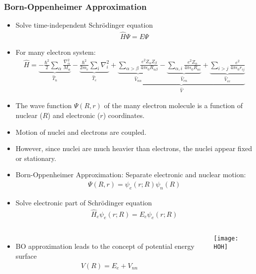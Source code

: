 \documentclass[slidestop,mathserif,compress,xcolor=svgnames]{beamer}
\begin{document}
\begin{frame}[allowframebreaks]
\frametitle{\small Born-Oppenheimer Approximation}
\footnotesize{
\begin{itemize}
\item Solve time-independent Schr\"{o}dinger equation
\begin{align*}
\hat{H}\Psi = E\Psi
\end{align*}
\item For many electron system:
\begin{align*}
\hat{H} = \underbrace{-\frac{\hbar^2}{2}\sum_\alpha\frac{\nabla^2_\alpha}{M_\alpha}}_{\hat{T}_n} - \underbrace{\frac{\hbar^2}{2m_e}\sum_i\nabla^2_i}_{\hat{T}_e} + \underbrace{\underbrace{\sum_{\alpha>\beta}\frac{e^2Z_{\alpha}Z_{\beta}}{4\pi\epsilon_0R_{\alpha\beta}}}_{\hat{V}_{nn}} - \underbrace{\sum_{\alpha,i}\frac{e^2Z_{\alpha}}{4\pi\epsilon_0R_{\alpha i}}}_{\hat{V}_{en}} + \underbrace{\sum_{i>j}\frac{e^2}{4\pi\epsilon_0r_{ij}}}_{\hat{V}_{ee}}}_{\hat{V}}
\end{align*}
\item The wave function $\Psi(R,r)$ of the many electron molecule is a function of nuclear ($R$) and electronic ($r$) coordinates.
\item Motion of nuclei and electrons are coupled.
\item However, since nuclei are much heavier than electrons, the nuclei appear fixed or stationary.
\item Born-Oppenheimer Approximation: Separate electronic and nuclear motion:
\begin{align*}
\Psi(R,r) = \psi_e(r;R)\psi_n(R)
\end{align*}
\item Solve electronic part of Schr\"{o}dinger equation
\begin{align*}
\hat{H}_e\psi_e(r;R) = E_e\psi_e(r;R)
\end{align*}
\end{itemize}
\begin{columns}
\column{5cm}
\vspace{-0.5cm}
\begin{itemize}
\item 
BO approximation leads to the concept of potential energy surface
\begin{align*}
V(R) = E_e + V_{nn}
\end{align*}
\end{itemize}
\column{5cm}
\vspace{-0.5cm}
\texttt{[image: HOH]}
\end{columns}
}
\end{frame}
\end{document}
